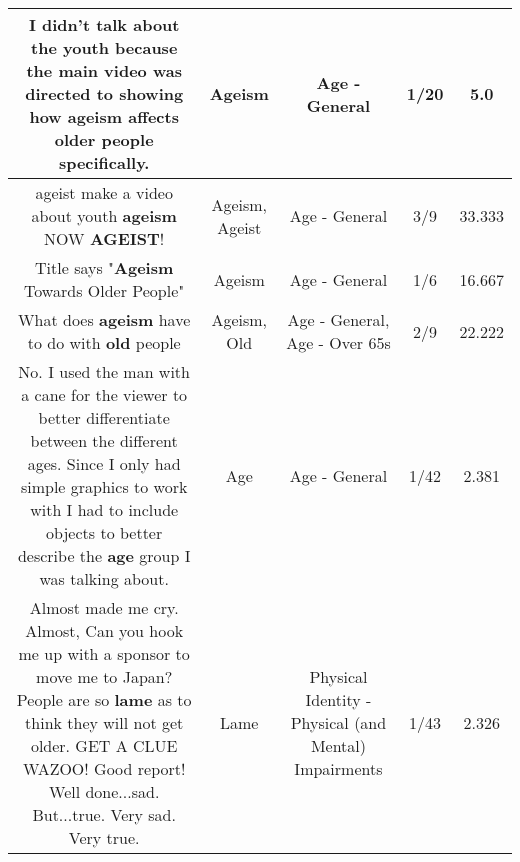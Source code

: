 \documentclass[11pt]{article}
\newlength\mylength
\begin{document}
\begin{center}
\begin{longtable}{|C{.65\mylength}|C{.30\mylength}|C{.12\mylength}|C{.12\mylength}|C{.12\mylength}|}
  \small I didn't talk about the youth because the main video was directed to showing how \textbf{ageism} affects older people specifically.\normalsize   & Ageism & Age - General & 1/20 & 5.0 \\  \hline
  \small ageist make a video about youth \textbf{ageism} NOW \textbf{AGEIST}!\normalsize   & Ageism, Ageist & Age - General & 3/9 & 33.333 \\  \hline
  \small Title says "\textbf{Ageism} Towards Older People"\normalsize   & Ageism & Age - General & 1/6 & 16.667 \\  \hline
  \small What does \textbf{ageism} have to do with \textbf{old} people\normalsize   & Ageism, Old & Age - General, Age - Over 65s & 2/9 & 22.222 \\  \hline
  \small No. I used the man with a cane for the viewer to better differentiate between the different ages. Since I only had simple graphics to work with I had to include objects to better describe the \textbf{age} group I was talking about.\normalsize   & Age & Age - General & 1/42 & 2.381 \\  \hline
  \small Almost made me cry. Almost, Can you hook me up with a sponsor to move me to Japan? People are so \textbf{lame} as to think they will not get older. GET A CLUE WAZOO! Good report! Well done...sad. But...true. Very sad. Very true.\normalsize   & Lame & Physical Identity - Physical (and Mental) Impairments & 1/43 & 2.326 \\  \hline
  
\end{longtable}
\end{center}
\end{document}
